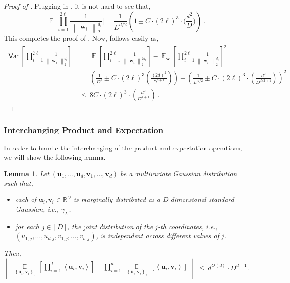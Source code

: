 \documentclass[11pt]{article}
\newcommand{\inbrace}[1]{\left \{ #1 \right \}}
\newcommand{\inparen}[1]{\left ( #1 \right )}
\newcommand{\insquare}[1]{\left [ #1 \right ]}
\newcommand{\inangle}[1]{\left \langle #1 \right \rangle}
\newcommand{\inabs}[1]{\begin{vmatrix} #1 \end{vmatrix}}
\newcommand{\norm}[2]{\begin{Vmatrix} #2 \end{Vmatrix}_{#1}}
\newcommand{\set}[1]{\inbrace{#1}}
\DeclareMathOperator*{\Ex}{\mathbb{E}}
\DeclareMathOperator*{\Var}{\mathsf{Var}}
\newcommand{\bbR}{{\mathbb R}}
\newcommand{\bu}{{\bm u}}
\newcommand{\bv}{{\bm v}}
\newcommand{\bw}{{\bm w}}
\newtheorem{lem}[theorem]{Lemma}
\begin{document}
\begin{proof}[Proof of ]
	Plugging  in , it is not hard to see that,
	\begin{equation*}
		\Ex\bigg[\prod_{i=1}^{2\ell} \frac{1}{\norm{2}{\bw_i}^{d_i}} \bigg] = \frac{1}{D^{d/2}} \inparen{1 \pm C \cdot (2\ell)^3 \cdot \bigg(\frac{d^2}{D} \bigg)}\;.
	\end{equation*}
	This completes the proof of . Now,  follows easily as,
	\begin{align*}
	\Var\insquare{\prod_{i=1}^{2\ell} \frac{1}{\norm{2}{\bw_i}^{d_i}}}
	&~=~ \Ex \insquare{\prod_{i=1}^{2\ell} \frac{1}{\norm{2}{\bw_i}^{2d_i}}} -  \Ex_{\bw}\insquare{\prod_{i=1}^{2\ell} \frac{1}{\norm{2}{\bw_i}^{d_i}}}^2\\ 
	&~=~ \inparen{\frac{1}{D^d} \pm C \cdot (2\ell)^3 \inparen{\frac{(2d)^2}{D^{d+1}}}} - \inparen{\frac{1}{D^{d/2}} \pm C \cdot (2\ell)^3 \cdot \inparen{\frac{d^2}{D^{d/2+1}}}}^2\\ 
	&~\le~ 8C \cdot (2\ell)^3 \cdot \inparen{\frac{d^2}{D^{d+1}}}\;.
	\end{align*}
\end{proof}

\subsubsection*{Interchanging Product and Expectation}

In order to handle the interchanging of the product and expectation operations, we will show the following lemma.

\begin{lem}\label{le:swap_exp_prod}
	Let $(\bu_1,\ldots,\bu_d, \bv_1,\ldots, \bv_d)$ be a multivariate Gaussian distribution such that,
	\begin{itemize}
		\item each of $\bu_i,\bv_i \in \bbR^D$ is marginally distributed as a $D$-dimensional standard Gaussian, i.e., $\gamma_D$.
		\item for each $j \in [D]$, the joint distribution of the $j$-th coordinates, i.e., $(u_{1,j}, \ldots, u_{d,j}, v_{1,j}, \ldots, v_{d,j})$, is independent across different values of $j$.
	\end{itemize}
	Then,
	\begin{equation*}
	\inabs{\Ex\limits_{\set{\bu_i, \bv_i}_i} \ \insquare{\prod_{i=1}^d \inangle{\bu_i, \bv_i}} - \prod_{i=1}^d \ \Ex\limits_{\set{\bu_i, \bv_i}_i} \ \insquare{\inangle{\bu_i, \bv_i}}} ~\le~ d^{O(d)} \cdot D^{d-1}.
	\end{equation*}
\end{lem}
\end{document}
